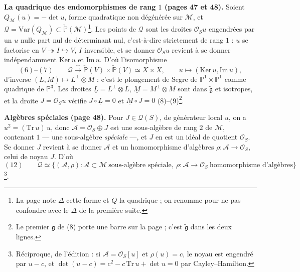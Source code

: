 \documentclass[11pt,a4paper]{article}
\begin{document}
\textbf{La quadrique des endomorphismes de rang $1$ (pages 47 et 48).} Soient
$Q_{\mathcal{M}}(u) = -\det u$, forme quadratique non dégénérée sur $\mathcal{M}$, et
$\mathcal{Q} = \mathrm{Var}(Q_{\mathcal{M}}) \subset \check{\mathbb{P}}(\mathcal{M})$\footnote{La page note
$\Delta$ cette forme et $Q$ la quadrique ; on renomme pour ne pas confondre avec
le $\Delta$ de la première suite.}. Les points de $\mathcal{Q}$ sont les droites
$\mathcal{O}_S u$ engendrées par un $u$ nulle part nul de déterminant nul, c'est-à-dire
strictement de rang $1$ : $u$ se factorise en $V \twoheadrightarrow I \hookrightarrow V$,
$I$ inversible, et se donner $\mathcal{O}_S u$ revient à se donner indépendamment
$\mathrm{Ker}\,u$ et $\mathrm{Im}\,u$. D'où l'isomorphisme
\[
  (6)\text{--}(7) \qquad \mathcal{Q} \xrightarrow{\ \sim\ } \check{\mathbb{P}}(V) \times \check{\mathbb{P}}(V)
  \simeq X \times X , \qquad u \longmapsto (\mathrm{Ker}\,u, \mathrm{Im}\,u) ,
\]
d'inverse $(L, M) \mapsto L^{\perp} \otimes M$ : c'est le plongement de Segre de
$\mathbb{P}^1 \times \mathbb{P}^1$ comme quadrique de $\mathbb{P}^3$. Les droites
$\underline{L} = L^{\perp} \otimes L$, $\underline{M} = M^{\perp} \otimes M$ sont dans
$\widetilde{\mathfrak{g}}$ et isotropes, et la droite $J = \mathcal{O}_S u$ vérifie
$J \circ \underline{L} = 0$ et $\underline{M} \circ J = 0$ (8)--(9)\footnote{Le
premier $\mathfrak{g}$ de (8) porte une barre sur la page ; c'est
$\widetilde{\mathfrak{g}}$ dans les deux lignes.}.

\textbf{Algèbres spéciales (page 48).} Pour $J \in \mathcal{Q}(S)$, de générateur local
$u$, on a $u^2 = (\mathrm{Tr}\,u)\,u$, donc $\mathcal{A} = \mathcal{O}_S \oplus J$ est une
sous-algèbre de rang $2$ de $\mathcal{M}$, contenant $1$ — une sous-algèbre
\emph{spéciale} —, et $J$ en est un idéal de quotient $\mathcal{O}_S$. Se donner $J$
revient à se donner $\mathcal{A}$ et un homomorphisme d'algèbres
$\rho : \mathcal{A} \to \mathcal{O}_S$, celui de noyau $J$. D'où
\[
  (12) \qquad \mathcal{Q} \simeq \bigl\{ (\mathcal{A}, \rho) : \mathcal{A} \subset \mathcal{M} \ \text{sous-algèbre spéciale},\
  \rho : \mathcal{A} \to \mathcal{O}_S \ \text{homomorphisme d'algèbres} \bigr\}
\]
\footnote{Réciproque, de l'édition : si $\mathcal{A} = \mathcal{O}_S[u]$ et
$\rho(u) = c$, le noyau est engendré par $u - c$, et
$\det(u - c) = c^2 - c\,\mathrm{Tr}\,u + \det u = 0$ par Cayley--Hamilton.}.
\end{document}
